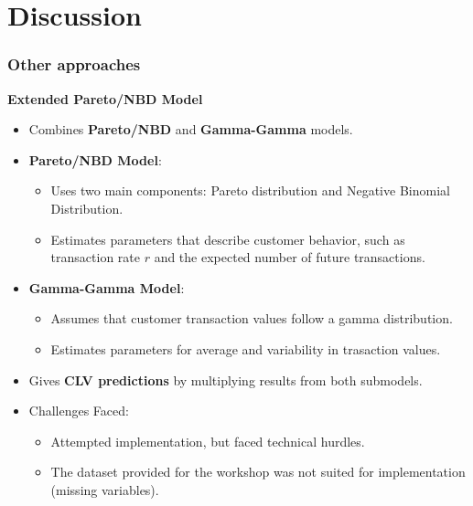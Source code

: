 \documentclass[aspectratio=169,xcolor=x11names,compress]{beamer}
\begin{document}
\section{Discussion}

\begin{frame}
\frametitle{Other approaches}

\textbf{Extended Pareto/NBD Model}

\begin{itemize}
  \item Combines \textbf{Pareto/NBD} and \textbf{Gamma-Gamma} models.
  
  \item \textbf{Pareto/NBD Model}:
  \begin{itemize}
    \item Uses two main components: Pareto distribution and Negative Binomial Distribution.
    \item Estimates parameters that describe customer behavior, such as transaction rate $r$ and the expected number of future transactions.
  \end{itemize}
  
  \item \textbf{Gamma-Gamma Model}:
  \begin{itemize}
    \item Assumes that customer transaction values follow a gamma distribution.
    \item Estimates parameters for average and variability in trasaction values.
  \end{itemize}
  
  \item Gives \textbf{CLV predictions} by multiplying results from both submodels.
  
  \item Challenges Faced:
  \begin{itemize}
    \item Attempted implementation, but faced technical hurdles.
    \item The dataset provided for the workshop was not suited for implementation (missing variables).
  \end{itemize}
\end{itemize}

\end{frame}
\end{document}
